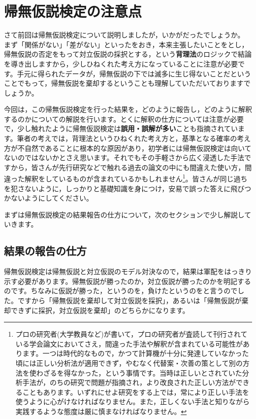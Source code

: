 \documentclass{ltjsbook}
\begin{document}
\chapter{帰無仮説検定の注意点}
\label{m19_NHST2}
さて前回は帰無仮説検定について説明しましたが，いかがだったでしょうか。
まず「関係がない」「差がない」といったをおき，本来主張したいことをとし，帰無仮説の否定をもって対立仮説の採択とする，という\textbf{背理法}のロジックで結論を導き出しますから，少しひねくれた考え方になっていることに注意が必要です。手元に得られたデータが，帰無仮説の下では滅多に生じ得ないことだということでもって，帰無仮説を棄却するということも理解していただいておりますでしょうか。

今回は，この帰無仮説検定を行った結果を，どのように報告し，どのように解釈するのかについての解説を行います。とくに解釈の仕方については注意が必要で，少し触れたように帰無仮説検定は\textbf{誤用・誤解が多い}ことも指摘されています。筆者の考えでは，背理法というひねくれた考え方と，基準となる確率の考え方が不自然であることに根本的な原因があり，初学者には帰無仮説検定は向いてないのではないかとさえ思います。それでもその手軽さから広く浸透した手法ですから，皆さんが先行研究などで触れる過去の論文の中にも間違えた使い方，間違った解釈をしているものが含まれているかもしれません\footnote{プロの研究者(大学教員など)が書いて，プロの研究者が査読して刊行されている学会論文においてさえ，間違った手法や解釈が含まれている可能性があります。一つは時代的なもので，かつて計算機が十分に発達していなかった頃には正しい分析法が適用できず，やむなく代替案・次善の策として別の方法を使わざるを得なかった，という事情です。当時は正しいとされていた分析手法が，のちの研究で問題が指摘され，より改良された正しい方法ができることもあります。いずれにせよ研究をする上では，常により正しい手法を使うように心がけなければなりません。また，正しくない手法と知りながら実践するような態度は厳に慎まなければなりません。}。皆さんが同じ過ちを犯さないように，しっかりと基礎知識を身につけ，安易で誤った答えに飛びつかないようにしてください。

まずは帰無仮説検定の結果報告の仕方について，次のセクションで少し解説していきます。

\section{結果の報告の仕方}
帰無仮説検定は帰無仮説と対立仮説のモデル対決なので，結果は軍配をはっきり示す必要があります。帰無仮説が勝ったのか，対立仮説が勝ったのかを明記するのです。ちなみに仮説が勝った，というのを，負けたというのをと言うのでした。ですから「帰無仮説を棄却して対立仮説を採択」，あるいは「帰無仮説が棄却できずに採択，対立仮説を棄却」のどちらかになります。
\end{document}
